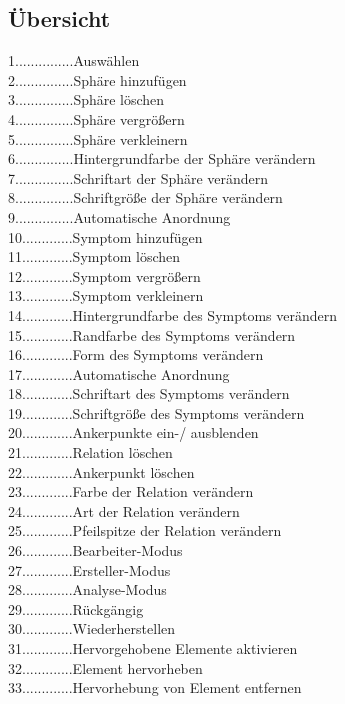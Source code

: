 \documentclass[enabledeprecatedfontcommands,fontsize=11pt,paper=a4,twoside]{scrartcl}
\newcommand*{\hdo}{.............}
\begin{document}
 
\subsection{Übersicht}
1\hdo..Auswählen \\
2\hdo..Sphäre hinzufügen \\
3\hdo..Sphäre löschen \\
4\hdo..Sphäre vergrößern \\
5\hdo..Sphäre verkleinern \\
6\hdo..Hintergrundfarbe der Sphäre verändern  \\
7\hdo..Schriftart der Sphäre verändern  \\
8\hdo..Schriftgröße der Sphäre verändern \\
9\hdo..Automatische Anordnung \\
10\hdo  Symptom hinzufügen \\
11\hdo  Symptom löschen \\
12\hdo  Symptom vergrößern \\
13\hdo  Symptom verkleinern \\
14\hdo  Hintergrundfarbe des Symptoms verändern \\
15\hdo  Randfarbe des Symptoms verändern \\
16\hdo  Form des Symptoms verändern \\
17\hdo  Automatische Anordnung \\
18\hdo  Schriftart des Symptoms verändern \\
19\hdo  Schriftgröße des Symptoms verändern \\
20\hdo  Ankerpunkte ein-/ ausblenden \\
21\hdo  Relation löschen \\
22\hdo  Ankerpunkt löschen \\
23\hdo  Farbe der Relation verändern \\
24\hdo  Art der Relation  verändern \\
25\hdo  Pfeilspitze der Relation verändern \\
26\hdo Bearbeiter-Modus\\
27\hdo Ersteller-Modus\\
28\hdo Analyse-Modus\\
29\hdo Rückgängig \\
30\hdo Wiederherstellen\\
31\hdo Hervorgehobene Elemente aktivieren\\
32\hdo Element hervorheben\\
33\hdo Hervorhebung von Element entfernen\\
\end{document}
